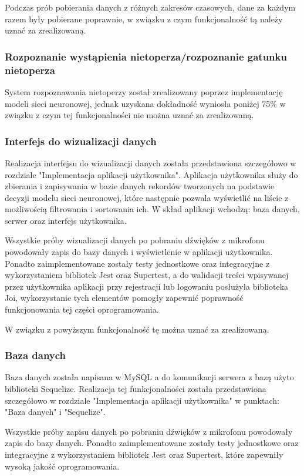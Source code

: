 \documentclass{sprz}
\begin{document}
Podczas prób pobierania danych z różnych zakresów czasowych, dane za każdym razem były pobierane poprawnie, w związku z czym funkcjonalność tą należy uznać za zrealizowaną.

\subsubsection{Rozpoznanie wystąpienia nietoperza/rozpoznanie gatunku nietoperza}
System rozpoznawania nietoperzy został zrealizowany poprzez implementację modeli sieci neuronowej, jednak uzyskana dokładność wyniosła poniżej 75\% w związku z czym tej funkcjonalności nie można uznać za zrealizowaną.

\subsubsection{Interfejs do wizualizacji danych}
Realizacja interfejsu do wizualizacji danych została przedstawiona szczegółowo w rozdziale "Implementacja aplikacji użytkownika". Aplikacja użytkownika służy do zbierania i zapisywania w bazie danych rekordów tworzonych na podstawie decyzji modelu sieci neuronowej, które następnie pozwala wyświetlić na liście z możliwością filtrowania i sortowania ich. W skład aplikacji wchodzą: baza danych, serwer oraz interfejs użytkownika. 

Wszystkie próby wizualizacji danych po pobraniu dźwięków z mikrofonu powodowały zapis do bazy danych i wyświetlenie w aplikacji użytkownika. Ponadto zaimplementowane zostały testy jednostkowe oraz integracyjne z wykorzystaniem bibliotek Jest oraz Supertest, a do walidacji treści wpisywanej przez użytkownika aplikacji przy rejestracji lub logowaniu posłużyła biblioteka Joi, wykorzystanie tych elementów pomogły zapewnić poprawność funkcjonowania tej części oprogramowania.

W związku z powyższym funkcjonalność tę można uznać za zrealizowaną.

\subsubsection{Baza danych}
Baza danych została napisana w MySQL a do komunikacji serwera z bazą użyto biblioteki Sequelize. Realizacja tej funkcjonalności została przedstawiona szczegółowo w rozdziale "Implementacja aplikacji użytkownika" w punktach: "Baza danych" i "Sequelize". 

Wszystkie próby zapisu danych po pobraniu dźwięków z mikrofonu powodowały zapis do bazy danych. Ponadto zaimplementowane zostały testy jednostkowe oraz integracyjne z wykorzystaniem bibliotek Jest oraz Supertest, które zapewniły wysoką jakość oprogramowania.
\end{document}
